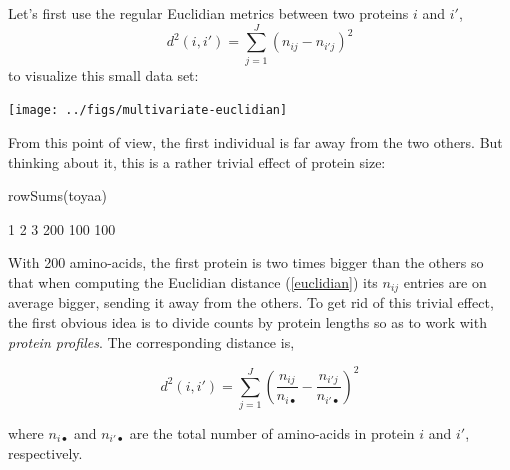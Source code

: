 \documentclass{article}
\begin{document}


Let's first use the regular Euclidian metrics between two proteins $i$ and $i'$,
\begin{equation}
d^2(i,i') = \sum_{j=1}^{J}(n_{ij} - n_{i'j})^2
\label{euclidian}
\end{equation}
to visualize this small data set:

\begin{Schunk}
\end{Schunk}
\texttt{[image: ../figs/multivariate-euclidian]}

From this point of view, the first individual is far away from the two others. But
thinking about it, this is a rather trivial effect of protein size:

\begin{Schunk}
\begin{Sinput}
 rowSums(toyaa)
\end{Sinput}
\begin{Soutput}
  1   2   3 
200 100 100 
\end{Soutput}
\end{Schunk}

With 200 amino-acids, the first protein is two times bigger 
than the others so that when computing the Euclidian distance (\ref{euclidian}) its $n_{ij}$ entries
are on average bigger, sending it away from the others.
To get rid of this trivial effect, the first
obvious idea is to divide counts by protein lengths so as to work with 
\emph{protein profiles}. The corresponding distance is,

\begin{equation}
d^2(i,i') = \sum_{j=1}^{J}(\frac{n_{ij}}{n_{i\bullet}} - \frac{n_{i'j}}{n_{i'\bullet}})^2
\label{euclprof}
\end{equation}

where $n_{i\bullet}$ and $n_{i'\bullet}$ are the total number of amino-acids
in protein $i$ and $i'$, respectively.
\end{document}
